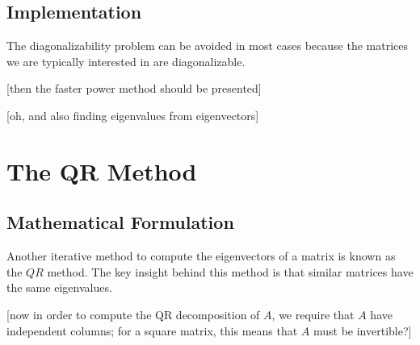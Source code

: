 \documentclass{article}
\begin{document}
\subsection{Implementation}

The diagonalizability problem can be avoided in most cases because the matrices we are typically interested in are diagonalizable.

[then the faster power method should be presented]

[oh, and also finding eigenvalues from eigenvectors]

\section{The QR Method}
\subsection{Mathematical Formulation}
Another iterative method to compute the eigenvectors of a matrix is known as the $QR$ method. The key insight behind this method is that similar matrices have the same eigenvalues.

[now in order to compute the QR decomposition of $A$, we require that $A$ have independent columns; for a square matrix, this means that $A$ must be invertible?]
\end{document}
